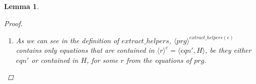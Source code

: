 \documentclass[11pt]{article} %
\newtheorem{lemma}{Lemma}
\begin{document}
\begin{lemma}
\begin{proof}
\begin{enumerate}
%
%
%

\item As we can see in the definition of $extract\_helpers$, $\langle prg \rangle^{extract\_helpers(e)}$ contains only equations that are contained in $\langle r \rangle^{e} = \big\langle eqn', H \big\rangle$, be they either $eqn'$ or contained in $H$, for some $r$ from the equations of $prg$.

\end{enumerate}

\end{proof}

\end{lemma}
\end{document}
